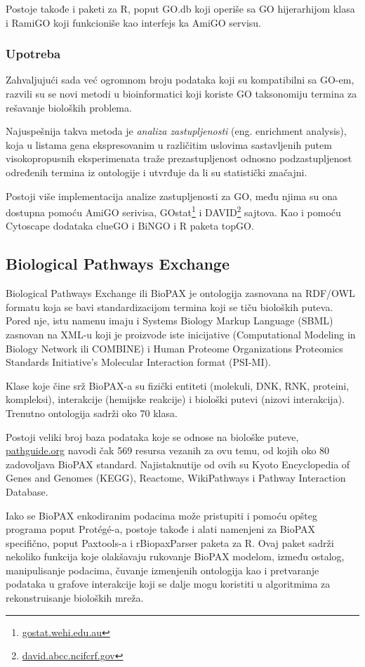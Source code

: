 Postoje takođe i paketi za R, poput GO.db koji operiše sa GO hijerarhijom klasa i RamiGO koji funkcioniše kao interfejs ka AmiGO servisu.

\subsubsection{Upotreba}

Zahvaljujući sada već ogromnom broju podataka koji su kompatibilni sa GO-em, razvili su se novi metodi u bioinformatici koji koriste GO taksonomiju termina za rešavanje bioloških problema. 

Najuspešnija takva metoda je \emph{analiza zastupljenosti} (eng. enrichment analysis), koja u listama gena ekspresovanim u različitim uslovima sastavljenih putem visokopropusnih eksperimenata traže prezastupljenost odnosno podzastupljenost određenih termina iz ontologije i utvrđuje da li su statistički značajni.

Postoji više implementacija analize zastupljenosti za GO, među njima su ona dostupna pomoću AmiGO serivisa, GOstat\footnote{\url{gostat.wehi.edu.au}} i DAVID\footnote{\url{david.abcc.ncifcrf.gov}} sajtova. Kao i pomoću Cytoscape dodataka clueGO i BiNGO i R paketa topGO.




\subsection{Biological Pathways Exchange}

Biological Pathways Exchange ili BioPAX je ontologija zasnovana na RDF/OWL formatu koja se bavi standardizacijom termina koji se tiču bioloških puteva. 
Pored nje, istu namenu imaju i Systems Biology Markup Language (SBML) zasnovan na XML-u koji je proizvode iste inicijative (Computational Modeling in Biology Network ili COMBINE) i Human Proteome Organizations Proteomics Standards Initiative’s Molecular Interaction format (PSI-MI).

Klase koje čine srž BioPAX-a su fizički entiteti (molekuli, DNK, RNK, proteini, kompleksi), interakcije (hemijske reakcije) i biološki putevi (nizovi interakcija). Trenutno ontologija sadrži oko 70 klasa.

Postoji veliki broj baza podataka koje se odnose na biološke puteve, \url{pathguide.org} navodi čak 569 resursa vezanih za ovu temu, od kojih oko 80 zadovoljava BioPAX standard.
Najistaknutije od ovih su Kyoto Encyclopedia of Genes and Genomes (KEGG), Reactome, WikiPathways i Pathway Interaction Database.

Iako se BioPAX enkodiranim podacima može pristupiti i pomoću opšteg programa poput Protégé-a, postoje takođe i alati namenjeni za BioPAX specifično, poput Paxtools-a i rBiopaxParser paketa za R.
Ovaj paket sadrži nekoliko funkcija koje olakšavaju rukovanje BioPAX modelom, između ostalog, manipulisanje podacima, čuvanje izmenjenih ontologija kao i pretvaranje podataka u grafove interakcije koji se dalje mogu koristiti u algoritmima za rekonstruisanje bioloških mreža.







